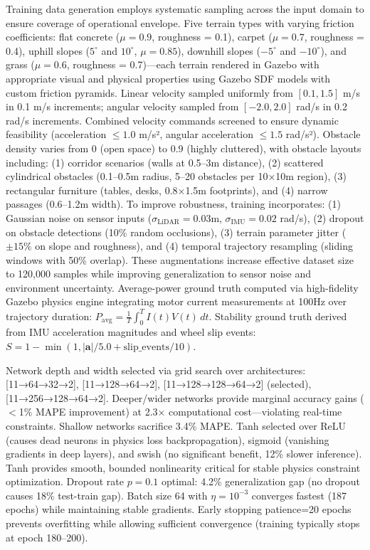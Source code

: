 \documentclass[pdflatex,sn-nature]{sn-jnl}%
\begin{document}
Training data generation employs systematic sampling across the input domain to ensure coverage of operational envelope. Five terrain types with varying friction coefficients: flat concrete ($\mu = 0.9$, roughness = 0.1), carpet ($\mu = 0.7$, roughness = 0.4), uphill slopes ($5^{\circ}$ and $10^{\circ}$, $\mu = 0.85$), downhill slopes ($-5^{\circ}$ and $-10^{\circ}$), and grass ($\mu = 0.6$, roughness = 0.7)—each terrain rendered in Gazebo with appropriate visual and physical properties using Gazebo SDF models with custom friction pyramids. Linear velocity sampled uniformly from $[0.1, 1.5]$ m/s in 0.1 m/s increments; angular velocity sampled from $[-2.0, 2.0]$ rad/s in 0.2 rad/s increments. Combined velocity commands screened to ensure dynamic feasibility (acceleration $\leq 1.0$ m/s², angular acceleration $\leq 1.5$ rad/s²). Obstacle density varies from 0 (open space) to 0.9 (highly cluttered), with obstacle layouts including: (1) corridor scenarios (walls at 0.5--3m distance), (2) scattered cylindrical obstacles (0.1--0.5m radius, 5--20 obstacles per 10×10m region), (3) rectangular furniture (tables, desks, 0.8×1.5m footprints), and (4) narrow passages (0.6--1.2m width). To improve robustness, training incorporates: (1) Gaussian noise on sensor inputs ($\sigma_{\text{LiDAR}} = 0.03$m, $\sigma_{\text{IMU}} = 0.02$ rad/s), (2) dropout on obstacle detections (10\% random occlusions), (3) terrain parameter jitter ($\pm 15\%$ on slope and roughness), and (4) temporal trajectory resampling (sliding windows with 50\% overlap). These augmentations increase effective dataset size to 120,000 samples while improving generalization to sensor noise and environment uncertainty. Average-power ground truth computed via high-fidelity Gazebo physics engine integrating motor current measurements at 100Hz over trajectory duration: $P_{\text{avg}} = \frac{1}{T}\int_0^T I(t) V(t) \, dt$. Stability ground truth derived from IMU acceleration magnitudes and wheel slip events: $S = 1 - \min(1, |\mathbf{a}|/5.0 + \text{slip\_events}/10)$.

Network depth and width selected via grid search over architectures: [11→64→32→2], [11→128→64→2], [11→128→128→64→2] (selected), [11→256→128→64→2]. Deeper/wider networks provide marginal accuracy gains ($<$1\% MAPE improvement) at 2.3× computational cost—violating real-time constraints. Shallow networks sacrifice 3.4\% MAPE. Tanh selected over ReLU (causes dead neurons in physics loss backpropagation), sigmoid (vanishing gradients in deep layers), and swish (no significant benefit, 12\% slower inference). Tanh provides smooth, bounded nonlinearity critical for stable physics constraint optimization. Dropout rate $p=0.1$ optimal: 4.2\% generalization gap (no dropout causes 18\% test-train gap). Batch size 64 with $\eta = 10^{-3}$ converges fastest (187 epochs) while maintaining stable gradients. Early stopping patience=20 epochs prevents overfitting while allowing sufficient convergence (training typically stops at epoch 180--200).
\end{document}
